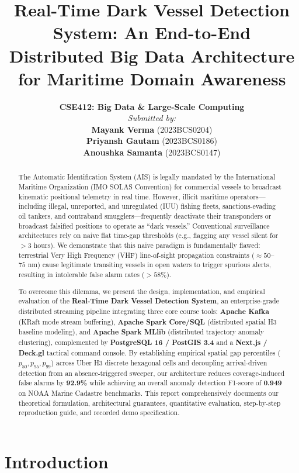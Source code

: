 \documentclass[10pt,twocolumn,a4paper]{article}
\title{\vspace{-1.0cm}\textbf{\Large Real-Time Dark Vessel Detection System: An End-to-End Distributed Big Data Architecture for Maritime Domain Awareness}}
\author{
    \begin{minipage}[t]{0.95\textwidth}
        \raggedright
        \small
        \textbf{CSE412: Big Data \& Large-Scale Computing} \\[0.25cm]
        \textit{Submitted by:} \\
        \textbf{Mayank Verma} (2023BCS0204) \\
        \textbf{Priyansh Gautam} (2023BCS0186) \\
        \textbf{Anoushka Samanta} (2023BCS0147)
    \end{minipage}
}
\date{}
\begin{document}
\maketitle

\begin{abstract}
The Automatic Identification System (AIS) is legally mandated by the International Maritime Organization (IMO SOLAS Convention) for commercial vessels to broadcast kinematic positional telemetry in real time. However, illicit maritime operators---including illegal, unreported, and unregulated (IUU) fishing fleets, sanctions-evading oil tankers, and contraband smugglers---frequently deactivate their transponders or broadcast falsified positions to operate as ``dark vessels.'' Conventional surveillance architectures rely on naive flat time-gap thresholds (e.g., flagging any vessel silent for $>3$ hours). We demonstrate that this naive paradigm is fundamentally flawed: terrestrial Very High Frequency (VHF) line-of-sight propagation constraints ($\approx 50$--$75\text{ nm}$) cause legitimate transiting vessels in open waters to trigger spurious alerts, resulting in intolerable false alarm rates ($>58\%$). 

To overcome this dilemma, we present the design, implementation, and empirical evaluation of the \textbf{Real-Time Dark Vessel Detection System}, an enterprise-grade distributed streaming pipeline integrating three core course tools: \textbf{Apache Kafka} (KRaft mode stream buffering), \textbf{Apache Spark Core/SQL} (distributed spatial H3 baseline modeling), and \textbf{Apache Spark MLlib} (distributed trajectory anomaly clustering), complemented by \textbf{PostgreSQL 16 / PostGIS 3.4} and a \textbf{Next.js / Deck.gl} tactical command console. By establishing empirical spatial gap percentiles ($p_{50}, p_{95}, p_{99}$) across Uber H3 discrete hexagonal cells and decoupling arrival-driven detection from an absence-triggered sweeper, our architecture reduces coverage-induced false alarms by \textbf{92.9\%} while achieving an overall anomaly detection F1-score of \textbf{0.949} on NOAA Marine Cadastre benchmarks. This report comprehensively documents our theoretical formulation, architectural guarantees, quantitative evaluation, step-by-step reproduction guide, and recorded demo specification.
\end{abstract}

\section{Introduction}
\label{sec:intro}
\end{document}
